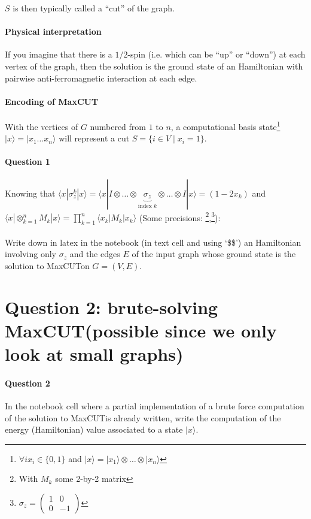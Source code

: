 \documentclass{article}
\newcommand{\maxcut}{{\sc MaxCUT}}
\begin{document}
$S$ is then typically called a ``cut'' of the graph.

\paragraph{Physical interpretation} If you imagine that there is a $1/2$-spin (i.e. which can be ``up'' or ``down'') at 
each vertex of the graph, then the solution is the ground state of an Hamiltonian with pairwise anti-ferromagnetic 
interaction at each edge.

\paragraph{Encoding of \maxcut} With the vertices of $G$ numbered from $1$ to $n$,
a computational basis state\footnote{$\forall i x_i\in\{0,1\}$ and $|x\rangle=|x_1\rangle\otimes\dots\otimes|x_n\rangle$} 
$|x\rangle=|x_1\dots x_n\rangle$ will represent a cut $S=\{i\in V \mid x_i = 1\}$.

\paragraph{Question 1} Knowing that $\langle x | \sigma_z^k | x\rangle=\langle x | I\otimes \dots \otimes \underbrace{\sigma_z}_{\text{index }k} \otimes\dots \otimes I | x \rangle = (1-2x_k)$
and $\langle x | \otimes_{k=1}^n M_k | x \rangle = \prod_{k=1}^{n} \langle x_k | M_k |x_k \rangle$ 
(Some precisions: \footnote{With $M_k$ some 
2-by-2 matrix},\footnote{$\sigma_z=\begin{pmatrix}1 & 0 \\ 0 & -1\end{pmatrix}$}):\\~\\ 
Write down in latex in the notebook (in text cell and using `\$\$') an Hamiltonian involving only $\sigma_z$ 
and the edges $E$ of the input graph whose ground state is the solution to \maxcut on $G=(V,E)$.

\section{Question 2: brute-solving \maxcut (possible since we only look at small graphs) }

\paragraph{Question 2} In the notebook cell where a partial implementation of a brute force
computation of the solution to \maxcut is already written, write the computation of the
energy (Hamiltonian) value associated to a state $|x\rangle$. 
\end{document}
